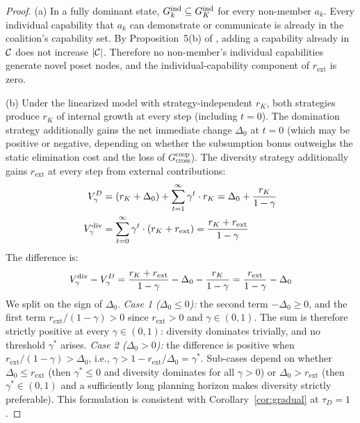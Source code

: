 \begin{proof}
(a) In a fully dominant state, $G_{k}^{\mathrm{ind}} \subseteq G_K^{\mathrm{ind}}$
for every non-member $a_k$. Every individual capability that $a_k$ can
demonstrate or communicate is already in the coalition's capability set. By
Proposition~5(b) of \citet{lasser2026poset}, adding a capability already in
$\mathcal{C}$ does not increase $|\mathcal{C}|$. Therefore no non-member's individual
capabilities generate novel poset nodes, and the individual-capability
component of $r_{\mathrm{ext}}$ is zero.

(b) Under the linearized model with strategy-independent $r_K$, both
strategies produce $r_K$ of internal growth at every step (including
$t = 0$). The domination strategy additionally gains the net immediate
change $\Delta_0$ at $t = 0$ (which may be positive or negative,
depending on whether the subsumption bonus outweighs the static
elimination cost and the loss of $G^{\mathrm{coop}}_{\mathrm{cross}}$).
The diversity strategy additionally gains $r_{\mathrm{ext}}$ at every
step from external contributions:
\begin{align*}
V_\gamma^{D} &= (r_K + \Delta_0)
  + \sum_{t=1}^{\infty} \gamma^t \cdot r_K
  = \Delta_0 + \frac{r_K}{1 - \gamma} \\
V_\gamma^{\mathrm{div}} &= \sum_{t=0}^{\infty} \gamma^t
  \cdot (r_K + r_{\mathrm{ext}})
  = \frac{r_K + r_{\mathrm{ext}}}{1 - \gamma}
\end{align*}
The difference is:
\[
V_\gamma^{\mathrm{div}} - V_\gamma^{D}
  = \frac{r_K + r_{\mathrm{ext}}}{1 - \gamma}
     - \Delta_0 - \frac{r_K}{1 - \gamma}
  = \frac{r_{\mathrm{ext}}}{1 - \gamma} - \Delta_0
\]
We split on the sign of $\Delta_0$. \emph{Case 1 ($\Delta_0 \leq 0$):}
the second term $-\Delta_0 \geq 0$, and the first term
$r_{\mathrm{ext}} / (1 - \gamma) > 0$ since $r_{\mathrm{ext}} > 0$ and
$\gamma \in (0, 1)$. The sum is therefore strictly positive at every
$\gamma \in (0, 1)$: diversity dominates trivially, and no threshold
$\gamma^*$ arises. \emph{Case 2 ($\Delta_0 > 0$):} the difference is
positive when $r_{\mathrm{ext}} / (1 - \gamma) > \Delta_0$, i.e.,
$\gamma > 1 - r_{\mathrm{ext}} / \Delta_0 = \gamma^*$. Sub-cases depend
on whether $\Delta_0 \leq r_{\mathrm{ext}}$ (then $\gamma^* \leq 0$ and
diversity dominates for all $\gamma > 0$) or $\Delta_0 > r_{\mathrm{ext}}$
(then $\gamma^* \in (0, 1)$ and a sufficiently long planning horizon
makes diversity strictly preferable). This formulation is consistent
with Corollary~\ref{cor:gradual} at $\tau_D = 1$.
\end{proof}

